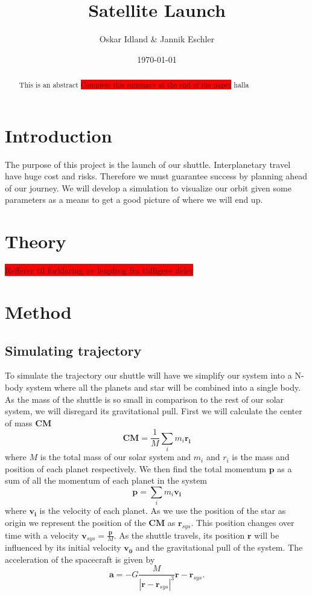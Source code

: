 \documentclass[reprint,english,notitlepage]{revtex4-2}
\begin{document}
\title{Satellite Launch}
\author{Oskar Idland \& Jannik Eschler}
\date{\today}

\begin{abstract}
    This is an abstract \colorbox{red}{Complete this summary at the end of the paper} halla 
\end{abstract}
\maketitle

\section{Introduction} \label{sec:introduction}
The purpose of this project is the launch of our shuttle.
Interplanetary travel have huge cost and risks.
Therefore we must guarantee success by planning ahead of our journey.
We will develop a simulation to visualize our orbit given some parameters as a means to get a good picture of where we will end up.

\section{Theory} \label{sec: theory}
\colorbox{red}{Refferer til forklaring av leapfrog fra tidligere deler}

\section{Method} \label{sec: method}
\subsection{Simulating trajectory} \label{ssec: simulating trajectory}
To simulate the trajectory our shuttle will have we simplify our system into a N-body system where all the planets and star will be combined into a single body. As the mass of the shuttle is so small in comparison to the rest of our solar system, we will disregard its gravitational pull. First we will calculate the center of mass $ \mathbf{CM} $
\[
\mathbf{CM} = \frac{1}{M} \sum_{i} m_i \mathbf{r_i}
\]
where $ M $ is the total mass of our solar system and $ m_i $ and $ r_i $ is the mass and position of each planet respectively. We then find the total momentum $ \mathbf{p} $ as a sum of all the momentum of each planet in the system
\[
\mathbf{p} = \sum_{i} m_i \mathbf{v_i}
\]
where $ \mathbf{v_i} $ is the velocity of each planet. 
As we use the position of the star as origin we represent the position of the $ \mathbf{CM} $ as $ \mathbf{r}_{sys} $. This position changes over time with a velocity $ \mathbf{v}_{sys} = \frac{\mathbf{p}}{M} $.  
As the shuttle travels, its position $ \mathbf{r} $ will be influenced by its initial velocity $ \mathbf{v_0} $ and the gravitational pull of the system. The acceleration of the spacecraft is given by 
\[
\mathbf{a} = -G \frac{M}{\left\vert \mathbf{r} - \mathbf{r}_{sys} \right\vert ^{3}} \mathbf{r} - \mathbf{r}_{sys}.
\]
\end{document}
